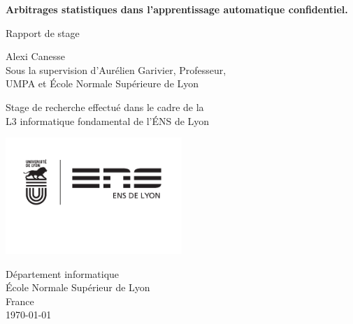 \begin{titlepage}
    \begin{center}
        \vspace*{1cm}
            
        \Huge
        \textbf{Arbitrages statistiques dans l'apprentissage automatique confidentiel.}
            
        \vspace{0.5cm}
        \LARGE
        Rapport de stage
            
        \vspace{1.5cm}
            
        \huge {\sc Alexi Canesse}\\\LARGE
        Sous la supervision d'{\sc Aurélien Garivier}, Professeur,\\ UMPA et École Normale Supérieure de Lyon
            
        \vfill
            
        Stage de recherche effectué dans le cadre de la \\
        L3 informatique fondamental de l'ÉNS de Lyon
            
        \vspace{0.8cm}
            
        \includegraphics[width=0.5\textwidth]{"./proofs/source/logo co UDL ENS 2016.pdf"}
            
        \Large
        Département informatique\\
        École Normale Supérieur de Lyon\\
        France\\
        \today
            
    \end{center}
\end{titlepage}





\newpage

\tableofcontents
\newpage

